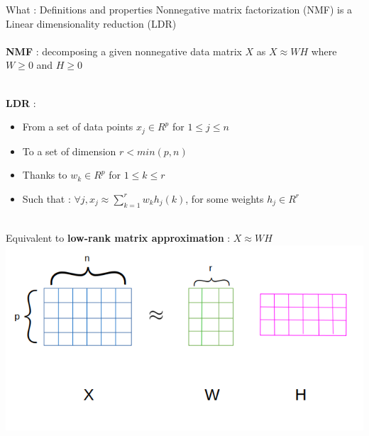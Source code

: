 \begin{frame}{What : Definitions and properties}
     Nonnegative matrix factorization (NMF) is a Linear dimensionality reduction (LDR) \\
         ~\\
         

     \textbf{NMF} : decomposing a given nonnegative data matrix $X$ as $X \approx W H$ where $W \geq 0$ and $H \geq 0$ %
     
          ~\\
          
     \textbf{LDR} : \\
     \begin{itemize}
         \item From a set of data points $x_j \in R^{p}$ for $1 \leq j \leq n$ 
         \item To a set of dimension $r < min(p,n)$
         \item Thanks to $w_k \in R^p$ for $1 \leq k \leq r$
         \item Such that : $\forall j, x_j \approx \sum_{k = 1}^{r} w_{k} h_{j}(k)$, for some weights $h_j\in R^r$
     \end{itemize}
              ~\\
     Equivalent to \textbf{low-rank matrix approximation} : $X \approx W H$\\
     
     \centering
\includegraphics[scale=0.28]{../images/matrices.png}


\end{frame}
